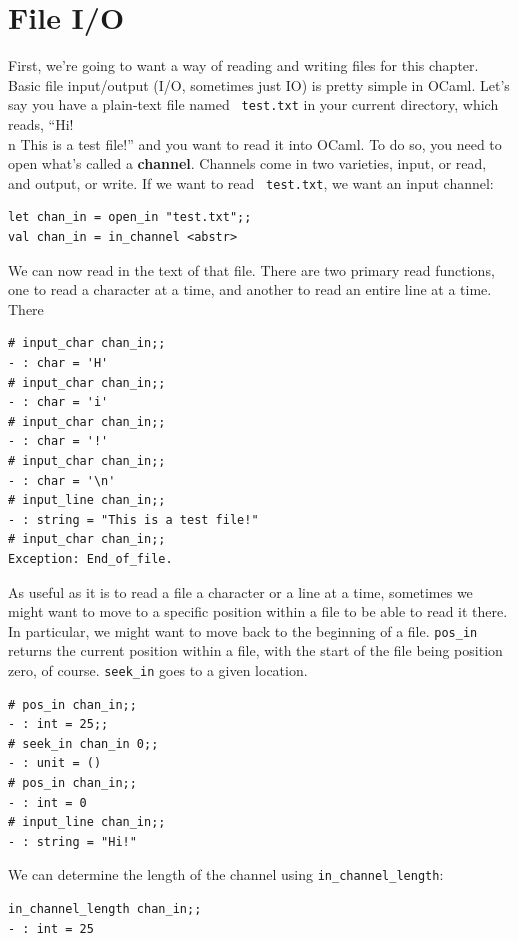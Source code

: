 \documentclass[10pt]{book}
\begin{document}
{\section{File I/O}


First, we're going to want a way of reading and writing files for this
chapter. Basic file input/output (I/O, sometimes just IO) is pretty
simple in OCaml. Let's say you have a plain-text file named {\tt
  test.txt} in your current directory, which reads, ``Hi! \\n This is a
test file!'' and you want to read it into OCaml. To do so, you need to
open what's called a {\bf channel}. Channels come in two varieties,
input, or read, and output, or write. If we want to read {\tt
  test.txt}, we want an input channel:

\beforeverb
\begin{verbatim}
let chan_in = open_in "test.txt";;
val chan_in = in_channel <abstr>
\end{verbatim}
\afterverb

We can now read in the text of that file. There are two primary read functions, one to read a character at a time, and another to read an entire line at a time. There 
\beforeverb
\begin{verbatim}
# input_char chan_in;;
- : char = 'H'
# input_char chan_in;;
- : char = 'i'
# input_char chan_in;;
- : char = '!'
# input_char chan_in;;
- : char = '\n'
# input_line chan_in;;
- : string = "This is a test file!"
# input_char chan_in;;
Exception: End_of_file.
\end{verbatim}
\afterverb

As useful as it is to read a file a character or a line at a time,
sometimes we might want to move to a specific position within a file
to be able to read it there. In particular, we might want to move back
to the beginning of a file. \verb"pos_in" returns the current position
within a file, with the start of the file being position zero, of
course. \verb"seek_in" goes to a given location.

\beforeverb
\begin{verbatim}
# pos_in chan_in;;
- : int = 25;;
# seek_in chan_in 0;;
- : unit = ()
# pos_in chan_in;;
- : int = 0
# input_line chan_in;;
- : string = "Hi!"
\end{verbatim}
\afterverb
We can determine the length of the channel using \verb"in_channel_length":
\beforeverb
\begin{verbatim}
in_channel_length chan_in;;
- : int = 25
\end{verbatim}
\afterverb

}
\end{document}

